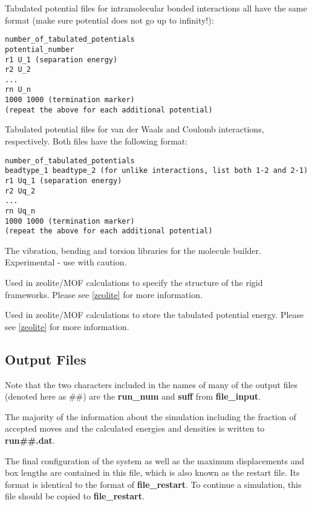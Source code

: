 \documentclass[12pt,letterpaper]{article}
\begin{document}
 Tabulated potential
files for intramolecular bonded interactions all have the
same format (make sure potential does not go up to
infinity!):
\begin{verbatim}
number_of_tabulated_potentials
potential_number
r1 U_1 (separation energy)
r2 U_2
...
rn U_n
1000 1000 (termination marker)
(repeat the above for each additional potential)
\end{verbatim}

 Tabulated potential files
for van der Waals and Coulomb interactions, respectively.
Both files have the following format:
\begin{verbatim}
number_of_tabulated_potentials
beadtype_1 beadtype_2 (for unlike interactions, list both 1-2 and 2-1)
r1 Uq_1 (separation energy)
r2 Uq_2
...
rn Uq_n
1000 1000 (termination marker)
(repeat the above for each additional potential)
\end{verbatim}

 The vibration,
bending and torsion libraries for the molecule builder.
Experimental - use with caution.

 Used
in zeolite/MOF calculations to specify the structure of the
rigid frameworks. Please see \ref{zeolite} for more
information.

 Used in zeolite/MOF calculations
to store the tabulated potential energy. Please see
\ref{zeolite} for more information.

\subsection{Output Files}
\label{output}
Note that the two characters included in the names of many
of the output files (denoted here as \#\#) are the {\bf
  run\_num} and {\bf suff} from {\bf file\_input}.

 The majority of the information
about the simulation including the fraction of accepted
moves and the calculated energies and densities is written
to {\bf run\#\#.dat}.

 The final configuration of the
system as well as the maximum displacements and box lengths
are contained in this file, which is also known as the
restart file. Its format is identical to the format of {\bf
  file\_restart}. To continue a simulation, this file should
be copied to {\bf file\_restart}.
\end{document}
